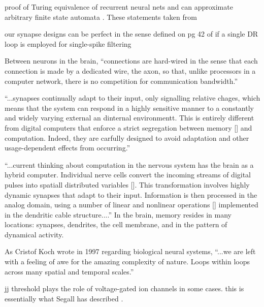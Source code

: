 \documentclass[twocolumn]{article}
\begin{document}
\vspace{3em}
proof of Turing equivalence of recurrent neural nets \cite{kisi1996} and can approximate arbitrary finite state automata \cite{omgi1994}. These statements taken from \cite{vesc2007}

\vspace{3em}
our synapse designs can be perfect in the sense defined on pg 42 of \cite{li1997} if a single DR loop is employed for single-spike filtering

\vspace{3em}
Between neurons in the brain, ``connections are hard-wired in the sense that each connection is made by a dedicated wire, the axon, so that, unlike processors in a computer network, there is no competition for communication bandwidth.'' \cite{ko1997}

\vspace{3em}
``...synapses continually adapt to their input, only signalling relative chages, which means that the system can respond in a highly sensitive manner to a constantly and widely varying external an dinternal environmentt. This is entirely different from digital computers that enforce a strict segregation between memory [] and computation. Indeed, they are carfully designed to avoid adaptation and other usage-dependent effects from occurring.'' \cite{ko1997}

\vspace{3em}
``...current thinking about computation in the nervous system has the brain as a hybrid computer. Individual nerve cells convert the incoming streams of digital pulses into spatiall distributed variables []. This transformation involves highly dynamic synapses that adapt to their input. Information is then processed in the analog domain, using a number of linear and nonlinear operations [] implemented in the dendritic cable structure....'' \cite{ko1997} In the brain, memory resides in many locations: synapses, dendrites, the cell membrane, and in the pattern of dynamical activity. 

\vspace{3em}
As Cristof Koch wrote in 1997 regarding biological neural systems, ``...we are left with a feeling of awe for the amazing complexity of nature. Loops within loops across many spatial and temporal scales.'' \cite{ko1997} 

\vspace{3em}
jj threshold plays the role of voltage-gated ion channels in some cases. this is essentially what Segall has described \cite{crsc2010}.
\end{document}
